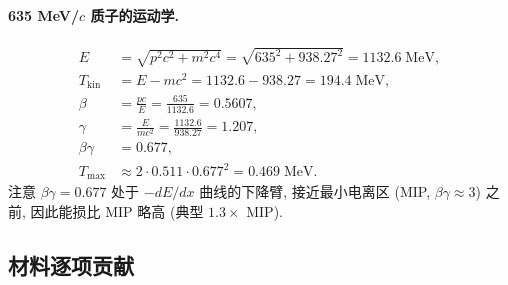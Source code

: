 \paragraph{635 MeV/$c$ 质子的运动学.}
\begin{align}
  E &= \sqrt{p^2 c^2 + m^2 c^4} = \sqrt{635^2 + 938.27^2} = 1132.6\;\mathrm{MeV}, \\
  T_\mathrm{kin} &= E - m c^2 = 1132.6 - 938.27 = 194.4\;\mathrm{MeV}, \\
  \beta &= \frac{p c}{E} = \frac{635}{1132.6} = 0.5607, \\
  \gamma &= \frac{E}{m c^2} = \frac{1132.6}{938.27} = 1.207, \\
  \beta\gamma &= 0.677, \\
  T_\mathrm{max} &\approx 2 \cdot 0.511 \cdot 0.677^2 = 0.469\;\mathrm{MeV}.
\end{align}
注意 $\beta\gamma = 0.677$ 处于 $-dE/dx$ 曲线的下降臂, 接近最小电离区 (MIP, $\beta\gamma \approx 3$) 之前, 因此能损比 MIP 略高 (典型 $1.3 \times$ MIP).

\subsection{材料逐项贡献}

